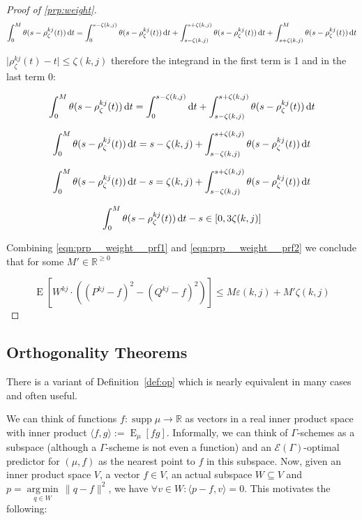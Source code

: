 \documentclass{article}
\numberwithin{equation}{section}
\theoremstyle{definition}
\theoremstyle{plain}
\DeclareMathOperator{\Supp}{supp}
\DeclareMathOperator{\E}{E}
\newcommand{\Argmin}[1]{\underset{#1}{\operatorname{arg\,min}}\,}
\newcommand{\Reals}{\mathbb{R}}
\newcommand{\Abs}[1]{\lvert #1 \rvert}
\newcommand{\Norm}[1]{\lVert #1 \rVert}
\newcommand{\Chev}[1]{\langle #1 \rangle}
\begin{document}
\begin{proof}[Proof of \ref{prp:weight}]
$$\int_0^M \theta(s-\rho_\zeta^{kj}(t)) \dif t = \int_0^{s-\zeta(k,j)} \theta(s-\rho_\zeta^{kj}(t)) \dif t + \int_{s-\zeta(k,j)}^{s+\zeta(k,j)} \theta(s-\rho_\zeta^{kj}(t)) \dif t + \int_{s+\zeta(k,j)}^M \theta(s-\rho_\zeta^{kj}(t)) \dif t$$

$\Abs{\rho_\zeta^{kj}(t)-t} \leq \zeta(k,j)$ therefore the integrand in the first term is 1 and in the last term 0:

$$\int_0^M \theta(s-\rho_\zeta^{kj}(t)) \dif t = \int_0^{s-\zeta(k,j)} \dif t + \int_{s-\zeta(k,j)}^{s+\zeta(k,j)} \theta(s-\rho_\zeta^{kj}(t)) \dif t$$

$$\int_0^M \theta(s-\rho_\zeta^{kj}(t)) \dif t = s-\zeta(k,j) + \int_{s-\zeta(k,j)}^{s+\zeta(k,j)} \theta(s-\rho_\zeta^{kj}(t)) \dif t$$

$$\int_0^M \theta(s-\rho_\zeta^{kj}(t)) \dif t - s = \zeta(k,j) + \int_{s-\zeta(k,j)}^{s+\zeta(k,j)} \theta(s-\rho_\zeta^{kj}(t)) \dif t$$

\begin{equation}
\label{eqn:prp__weight__prf2}
\int_0^M \theta(s-\rho_\zeta^{kj}(t)) \dif t - s \in [0,3\zeta(k,j)]
\end{equation}

Combining \ref{eqn:prp__weight__prf1} and \ref{eqn:prp__weight__prf2} we conclude that for some $M' \in \Reals^{\geq 0}$

$$\E[W^{kj} \cdot ((P^{kj}-f)^2-(Q^{kj}-f)^2)] \leq M \varepsilon(k,j) + M'\zeta(k,j)$$

\end{proof}

\subsection{Orthogonality Theorems}

There is a variant of Definition~\ref{def:op} which is nearly equivalent in many cases and often useful.

We can think of functions $f: \Supp \mu \rightarrow \Reals$ as vectors in a real inner product space with inner product $\Chev{f,g}:=\E_\mu[fg]$. Informally, we can think of $\Gamma$-schemes as a subspace (although a $\Gamma$-scheme is not even a function) and an $\mathcal{E}(\Gamma)$-optimal predictor for $(\mu,f)$ as the nearest point to $f$ in this subspace. Now, given an inner product space $V$, a vector $f \in V$, an actual subspace $W \subseteq V$ and $p = \Argmin{q \in W} \Norm{q - f}^2$, we have $\forall v \in W: \Chev{p-f,v}=0$. This motivates the following:
\end{document}
